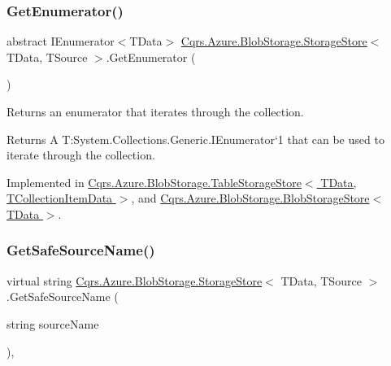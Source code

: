 \subsubsection{\texorpdfstring{Get\+Enumerator()}{GetEnumerator()}}
{\footnotesize\ttfamily abstract I\+Enumerator$<$T\+Data$>$ \hyperlink{classCqrs_1_1Azure_1_1BlobStorage_1_1StorageStore}{Cqrs.\+Azure.\+Blob\+Storage.\+Storage\+Store}$<$ T\+Data, T\+Source $>$.Get\+Enumerator (\begin{DoxyParamCaption}{ }\end{DoxyParamCaption})\hspace{0.3cm}{\ttfamily [pure virtual]}}



Returns an enumerator that iterates through the collection. 

\begin{DoxyReturn}{Returns}
A T\+:\+System.\+Collections.\+Generic.\+I\+Enumerator`1 that can be used to iterate through the collection. 
\end{DoxyReturn}


Implemented in \hyperlink{classCqrs_1_1Azure_1_1BlobStorage_1_1TableStorageStore_ac3e684b894e739f8936e537806952c49_ac3e684b894e739f8936e537806952c49}{Cqrs.\+Azure.\+Blob\+Storage.\+Table\+Storage\+Store$<$ T\+Data, T\+Collection\+Item\+Data $>$}, and \hyperlink{classCqrs_1_1Azure_1_1BlobStorage_1_1BlobStorageStore_a7b106644bd8bfe5b1b5e5ef7bc279769_a7b106644bd8bfe5b1b5e5ef7bc279769}{Cqrs.\+Azure.\+Blob\+Storage.\+Blob\+Storage\+Store$<$ T\+Data $>$}.

\mbox{\label{classCqrs_1_1Azure_1_1BlobStorage_1_1StorageStore_a3ed119d808d9b29e99b1c6c983831482_a3ed119d808d9b29e99b1c6c983831482}} 
\subsubsection{\texorpdfstring{Get\+Safe\+Source\+Name()}{GetSafeSourceName()}\hspace{0.1cm}{\footnotesize\ttfamily [1/2]}}
{\footnotesize\ttfamily virtual string \hyperlink{classCqrs_1_1Azure_1_1BlobStorage_1_1StorageStore}{Cqrs.\+Azure.\+Blob\+Storage.\+Storage\+Store}$<$ T\+Data, T\+Source $>$.Get\+Safe\+Source\+Name (\begin{DoxyParamCaption}\item[{string}]{source\+Name }\end{DoxyParamCaption})\hspace{0.3cm}{\ttfamily [protected]}, {\ttfamily [virtual]}}



